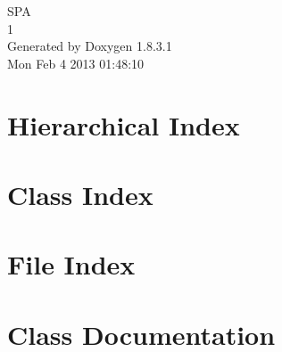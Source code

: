 \documentclass{book}
\begin{document}
\hypersetup{pageanchor=false,citecolor=blue}
\begin{titlepage}
\vspace*{7cm}
\begin{center}
{\Large S\-P\-A \\[1ex]\large 1 }\\
\vspace*{1cm}
{\large Generated by Doxygen 1.8.3.1}\\
\vspace*{0.5cm}
{\small Mon Feb 4 2013 01:48:10}\\
\end{center}
\end{titlepage}
\clearemptydoublepage
{}
\tableofcontents
\clearemptydoublepage
{}
\hypersetup{pageanchor=true,citecolor=blue}
\chapter{Hierarchical Index}

\chapter{Class Index}

\chapter{File Index}

\chapter{Class Documentation}


























\end{document}
